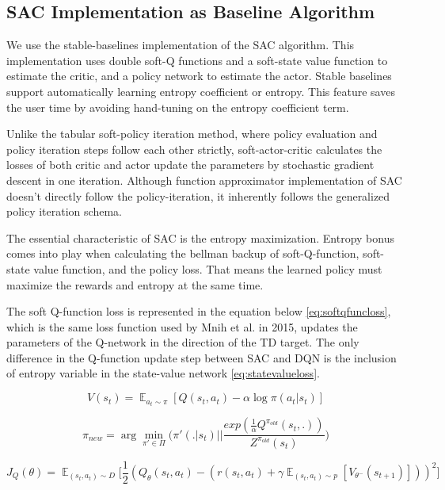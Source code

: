 \subsection{SAC Implementation as Baseline Algorithm}

We use the stable-baselines implementation of the SAC algorithm. This implementation uses double soft-Q functions and a soft-state value function to estimate the critic, and a policy network to estimate the actor. Stable baselines support automatically learning entropy coefficient or entropy. This feature saves the user time by avoiding hand-tuning on the entropy coefficient term.

Unlike the tabular soft-policy iteration method, where policy evaluation and policy iteration steps follow each other strictly, soft-actor-critic calculates the losses of both critic and actor update the parameters by stochastic gradient descent in one iteration. Although function approximator implementation of SAC doesn’t directly follow the policy-iteration, it inherently follows the generalized policy iteration schema. 

The essential characteristic of SAC is the entropy maximization. Entropy bonus comes into play when calculating the bellman backup of soft-Q-function, soft-state value function, and the policy loss. That means the learned policy must maximize the rewards and entropy at the same time. 

The soft Q-function loss is represented in the equation below \ref{eq:softqfuncloss}, which is the same loss function used by Mnih et al. in 2015, updates the parameters of the Q-network in the direction of the TD target. The only difference in the Q-function update step between SAC and DQN is the inclusion of entropy variable in the state-value network \ref{eq:statevalueloss}.

\begin{equation}
    V(s_t) = \mathop{\mathbb{E}}_{a_t \sim \pi}[Q(s_t,a_t)- \alpha \log \pi(a_t|s_t)]
    \label{eq:statevalueloss} 
\end{equation} 

\begin{equation}
    \pi_{new} = \arg\min\limits_{\pi' \in \Pi} \Bigg(\pi'(.|s_t) \Bigg|\Bigg| \frac{exp(\frac{1}{\alpha} Q^{\pi_{old}}(s_t,.))}{Z^{\pi_{old}}(s_t)} \Bigg)
\end{equation}

\begin{equation}
    J_Q(\theta) = \mathop{\mathbb{E}}_{(s_t,a_t)\sim D} \Big[ \frac{1}{2}(Q_{\theta}(s_t,a_t)-(r(s_t,a_t) + \gamma \mathop{\mathbb{E}}_{(s_t,a_t)\sim p}[V_{\theta^-}(s_{t+1})]))^2 \Big]
    \label{eq:softqfuncloss}
\end{equation}

